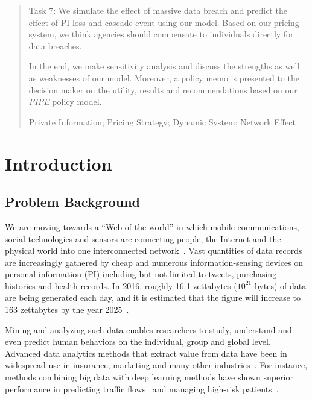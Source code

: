 \documentclass{mcmthesis}
\begin{document}
\begin{abstract}
Task 7: We simulate the effect of massive data breach and predict the effect of PI loss and cascade event using our model. Based on our pricing system, we think agencies should compensate to individuals directly for data breaches.

In the end, we make sensitivity analysis and discuss the strengths as well as weaknesses of our model. Moreover, a policy memo is presented to the decision maker on the utility, results and recommendations based on our \emph{PIPE} policy model.
 
 		\begin{keywords}
 			Private Information; Pricing Strategy; Dynamic System; Network Effect
 		\end{keywords}
 	\end{abstract}

\maketitle
\thispagestyle{fancy}
\rhead{}
\tableofcontents
\thispagestyle{fancy}

\newpage
\pagestyle{fancy}

\section{Introduction}
\label{sec:intro}
\subsection{Problem Background}

We are moving towards a ``Web of the world'' in which mobile communications, social technologies and sensors are connecting people, the Internet and the physical world into one interconnected network~\cite{rethinkingdavid}. Vast quantities of data records are increasingly gathered by cheap and numerous information-sensing devices on personal information (PI) including but not limited to tweets, purchasing histories and health records. In 2016, roughly 16.1 zettabytes (${10}^{21}$ bytes) of data are being generated each day, and it is estimated that the figure will increase to 163 zettabytes by the year 2025~\cite{datareinsel}.

Mining and analyzing such data enables researchers to study, understand and even predict human behaviors on the individual, group and global level. Advanced data analytics methods that extract value from data have been in widespread use in insurance, marketing and many other industries~\cite{wiki_big_data}. For instance, methods combining big data with deep learning methods have shown superior performance in predicting traffic flows~\cite{lv2015traffic} and managing high-risk patients~\cite{bates2014big}.
\end{document}
